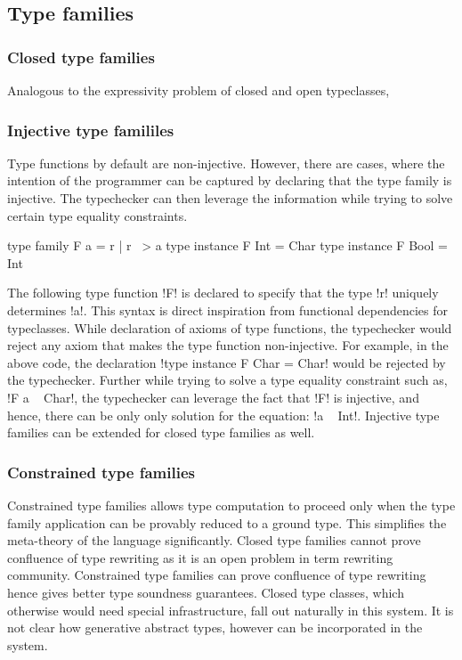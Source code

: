 \documentclass[manuscript,screen,nonacm]{acmart}
\begin{document}
\subsection{Type families}
\subsubsection{Closed type families}
Analogous to the expressivity problem of closed and open typeclasses,

\subsubsection{Injective type famililes}
Type functions by default are non-injective. However, there are cases, where the intention of the programmer can be captured by declaring that the type family is injective. The typechecker can then leverage the information while trying to solve certain type equality constraints.

\begin{CenteredBox}
\begin{code}
type family F a = r | r ~> a
type instance F Int = Char
type instance F Bool = Int
\end{code}
\end{CenteredBox}

The following type function !F! is declared to specify that the type !r! uniquely determines !a!. This syntax is direct inspiration from functional dependencies for typeclasses. While declaration of axioms of type functions, the typechecker would reject any axiom that makes the type function non-injective. For example, in the above code, the declaration !type instance F Char = Char! would be rejected by the typechecker. Further while trying to solve a type equality constraint such as, !F a ~ Char!, the typechecker can leverage the fact that !F! is injective, and hence, there can be only only solution for the equation: !a ~ Int!. Injective type families\cite{stolarek_injective_2015} can be extended for closed type families as well.

\subsubsection{Constrained type families}
Constrained type families allows type computation to proceed only when the type family application can be provably reduced to a ground type. This simplifies the meta-theory of the language significantly. Closed type families cannot prove confluence of type rewriting as it is an open problem in term rewriting community\cite{TODO}. Constrained type families can prove confluence of type rewriting hence gives better type soundness guarantees. Closed type classes, which otherwise would need special infrastructure, fall out naturally in this system. It is not clear how generative abstract types, however can be incorporated in the system.
\end{document}
